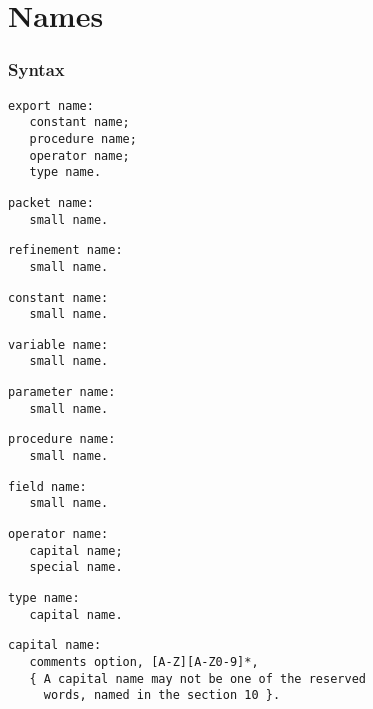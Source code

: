 \documentclass [a4paper,12pt,fleqn]{article}
\begin{document}
\section{Names}
\subsubsection*{Syntax}
\begin{letterlist}
\item
\begin{verbatim}
export name:
   constant name;
   procedure name;
   operator name;
   type name.
\end{verbatim}
\item
\begin{verbatim}
packet name:
   small name.
\end{verbatim}
\item
\begin{verbatim}
refinement name:
   small name.
\end{verbatim}
\item
\begin{verbatim}
constant name:
   small name.
\end{verbatim}
\item
\begin{verbatim}
variable name:
   small name.
\end{verbatim}
\item
\begin{verbatim}
parameter name:
   small name.
\end{verbatim}
\item
\begin{verbatim}
procedure name:
   small name.
\end{verbatim}
\item
\begin{verbatim}
field name:
   small name.
\end{verbatim}
\item
\begin{verbatim}
operator name:
   capital name;
   special name.
\end{verbatim}
\item
\begin{verbatim}
type name:
   capital name.
\end{verbatim}
\item
\begin{verbatim}
capital name:
   comments option, [A-Z][A-Z0-9]*,
   { A capital name may not be one of the reserved
     words, named in the section 10 }.

\end{verbatim}
\end{letterlist}
\end{document}

